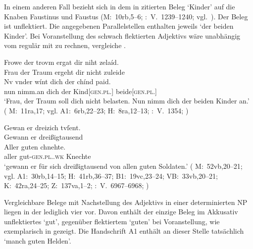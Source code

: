In einem anderen Fall bezieht sich in dem in  zitierten
Beleg  `Kinder' auf die Knaben Faustinus und Faustus (M:~10rb,5--6;
\KC:~V.~1239--1240; vgl.~\cite[104]{schroeder1895}). Der Beleg ist unflektiert.
Die angegebenen Parallelstellen enthalten jeweils  `der beiden Kinder'. Bei Voranstellung des schwach flektierten
Adjektivs wäre unabhängig vom  regulär mit
 zu rechnen, vergleiche .

\begin{exe}
\ex \label{ex:chindpaid}
\begin{xlist}
	\ex \label{ex:chindpaid_1}
		\gll Frowe der trovm ergat dir niht zelaíd. \\
			Frau der Traum ergeht dir nicht zuleide \\
	\sn \gll Nv {vnder wínt} dich der chínd paid. \\
			nun nimm.an dich der Kind[\textsc{gen.pl.\NeutM}]
			beide[\textsc{gen.pl.\NeutM}] \\
		\trans `Frau, der Traum soll dich nicht belasten. Nun nimm dich der
			beiden Kinder an.'
			(%
				M:~11ra,17; vgl.
				A1:~6rb,22--23;
				H:~8ra,12--13;
				\KC:~V.~1354;
				\cite[106]{schroeder1895}%
			)

	\ex \label{ex:chindpaid_2}
		\gll Gewan er {dreizich tvſent}. \\
			Gewann er dreißigtausend \\
	\sn \gll Aller guten chnehte. \\
			aller gut-\textsc{gen.pl.\MascM.wk} Knechte \\
		\trans `gewann er  für sich dreißigtausend
			von allen guten Soldaten.'
			(%
				M:~52vb,20--21; vgl.
				A1:~30rb,14--15;
				H:~41rb,36--37;
				B1:~19vc,23--24;
				VB:~33vb,20--21;
				K:~42ra,24--25;
				Z:~137va,1--2;
				\KC:~V.~6967--6968;
				\cite[209]{schroeder1895}%
			)
\end{xlist}
\end{exe}

Vergleichbare Belege mit Nachstellung des Adjektivs in
einer determinierten NP liegen in der
 lediglich vier vor. Davon enthält der einzige Beleg im
Akkusativ  unflektiertes  `gut', gegenüber
flektiertem  `guten' bei Voranstellung, wie exemplarisch in
 gezeigt. Die Handschrift A1 enthält an dieser Stelle
tatsächlich  `manch guten Helden'.

